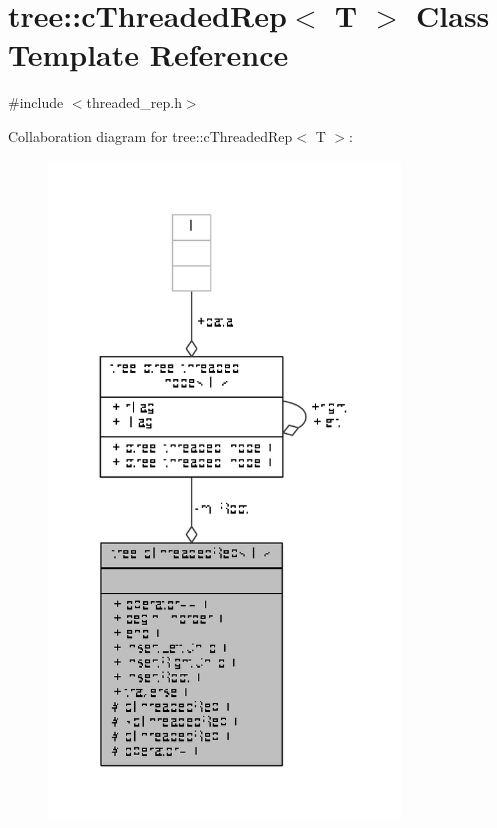 \hypertarget{classtree_1_1cThreadedRep}{\section{tree\-:\-:c\-Threaded\-Rep$<$ T $>$ Class Template Reference}
\label{classtree_1_1cThreadedRep}
}


{\ttfamily \#include $<$threaded\-\_\-rep.\-h$>$}



Collaboration diagram for tree\-:\-:c\-Threaded\-Rep$<$ T $>$\-:
\nopagebreak
\begin{figure}[H]
\begin{center}
\leavevmode
\includegraphics[width=265pt]{classtree_1_1cThreadedRep__coll__graph}
\end{center}
\end{figure}
